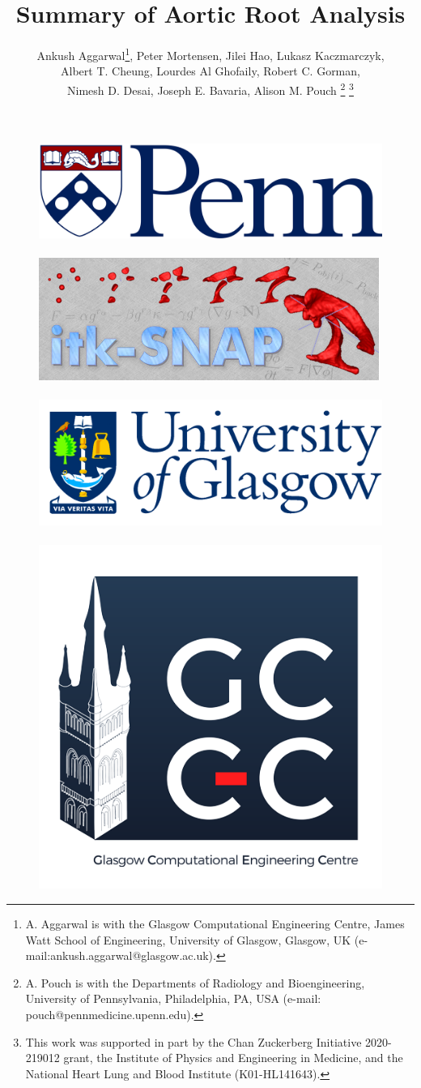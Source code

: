 \documentclass{article}
\title{Summary of Aortic Root Analysis}
\author{Ankush Aggarwal\thanks{A. Aggarwal is with the
Glasgow Computational Engineering Centre, James Watt School of Engineering, University of Glasgow, Glasgow, UK (e-mail:ankush.aggarwal@glasgow.ac.uk). }, Peter Mortensen, Jilei Hao, Lukasz Kaczmarczyk, \\ 
Albert T. Cheung, Lourdes Al Ghofaily, Robert C. Gorman, \\Nimesh D. Desai, Joseph E. Bavaria, Alison M. Pouch \thanks{A. Pouch is with the Departments of Radiology and Bioengineering, University of Pennsylvania, Philadelphia, PA, USA (e-mail: pouch@pennmedicine.upenn.edu).}
%
\thanks{This work was supported in part by the Chan Zuckerberg Initiative 2020-219012 grant, the Institute of Physics and Engineering in Medicine, and the National Heart Lung and Blood Institute (K01-HL141643).}
}
\begin{document}
\maketitle
\begin{figure}[t!]
\includegraphics[width = 0.25\linewidth]{UPennLogo}~~~~~\includegraphics[width = 0.25\linewidth]{ITKSnapLogo}~~~~~\includegraphics[width = 0.25\linewidth]{GlaLogo}~~~~~\includegraphics[width = 0.1\linewidth]{GCEC}
\end{figure}
\newpage
\end{document}
